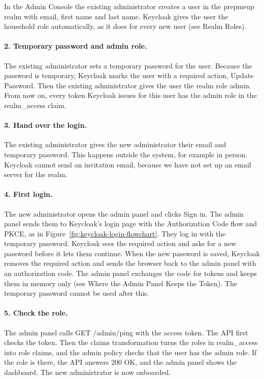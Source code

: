 \documentclass[a4paper,11pt]{article}
\begin{document}
In the Admin Console the existing administrator creates a user in the prepmeup realm with email, first name and last name. Keycloak gives the user the household role automatically, as it does for every new user (see Realm Roles).

\paragraph{2. Temporary password and admin role.} The existing administrator sets a temporary password for the user. Because the password is temporary, Keycloak marks the user with a required action, Update Password. Then the existing administrator gives the user the realm role admin. From now on, every token Keycloak issues for this user has the admin role in the realm\_access claim.

\paragraph{3. Hand over the login.} The existing administrator gives the new administrator their email and temporary password. This happens outside the system, for example in person. Keycloak cannot send an invitation email, because we have not set up an email server for the realm.

\paragraph{4. First login.} The new administrator opens the admin panel and clicks Sign in. The admin panel sends them to Keycloak's login page with the Authorization Code flow and PKCE, as in Figure~\ref{fig:keycloak-login-flowchart}. They log in with the temporary password. Keycloak sees the required action and asks for a new password before it lets them continue. When the new password is saved, Keycloak removes the required action and sends the browser back to the admin panel with an authorization code. The admin panel exchanges the code for tokens and keeps them in memory only (see Where the Admin Panel Keeps the Token). The temporary password cannot be used after this.

\paragraph{5. Check the role.} The admin panel calls GET /admin/ping with the access token. The API first checks the token. Then the claims transformation turns the roles in realm\_access into role claims, and the admin policy checks that the user has the admin role. If the role is there, the API answers 200 OK, and the admin panel shows the dashboard. The new administrator is now onboarded.
\end{document}
